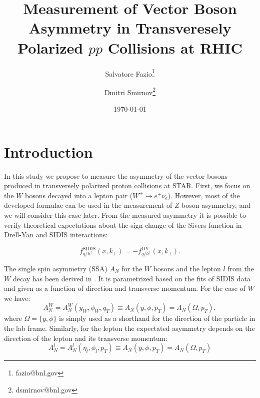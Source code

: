 \documentclass[12pt]{article}
\begin{document}
\setcounter{section}{0}
\setcounter{subsection}{0}
\setcounter{equation}{0}
\setcounter{figure}{0}
\setcounter{footnote}{0}
\setcounter{table}{0}


\title{Measurement of Vector Boson Asymmetry in Transveresely Polarized $pp$
Collisions at RHIC}

\author{Salvatore Fazio\thanks{fazio@bnl.gov}}
\author{Dmitri Smirnov\thanks{dsmirnov@bnl.gov}}

\date{\today}

\maketitle

\newpage
\tableofcontents 

\newpage
\linenumbers


\section{Introduction}

In this study we propose to measure the asymmetry of the vector bosons produced
in transversely polarized proton collisions at STAR. First, we focus on the $W$
bosons decayed into a lepton pair ($W^\pm \to e^\pm \nu_e$). However, most of the
developed formulae can be used in the measurement of $Z$ boson asymmetry, and
we will consider this case later. From the measured asymmetry it is possible to
verify theoretical expectations about the sign change of the Sivers function in
Drell-Yan and SIDIS interactions:

%
\begin{equation}
f^\text{SIDIS}_{q/h^\uparrow} (x, k_\perp) = - f^\text{DY}_{q/h^\uparrow} (x, k_\perp).
\end{equation}

The single spin asymmetry (SSA) $A_N$ for the $W$ bosons and the lepton $l$
from the $W$ decay has been derived in \cite{Kang:2009bp, zpaper}. It is
parametrized based on the fits of SIDIS data and given as a function of
direction and transverse momentum. For the case of $W$ we have:
%
\begin{equation}
A^W_N = A^W_N(y_W, \phi_W, q_T) \equiv A_N(y, \phi, p_T) = A_N(\Omega, p_T),
\label{eq:asym_wboson}
\end{equation}
%
where $\Omega = \{y, \phi\}$ is simply used as a shorthand for the direction of
the particle in the lab frame. Similarly, for the lepton the expectated
asymmetry depends on the direction of the lepton and its transverse momentum:
%
\begin{equation}
A^l_N = A^l_N(\eta_l, \phi_l, p_T) \equiv A_N(y, \phi, p_T) = A_N(\Omega, p_T)
\label{eq:asym_lepton}
\end{equation}
\end{document}
